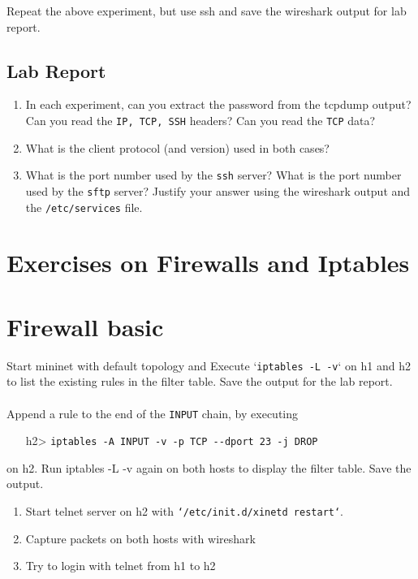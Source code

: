 \documentclass[10pt,a4paper]{article}
\numberwithin{equation}{section}
\numberwithin{figure}{section}
\numberwithin{table}{section}
\begin{document}
	Repeat the above experiment, but use ssh and save the wireshark output for lab report.
	
	\subsection*{Lab Report}
	\begin{enumerate}
		\setlength{\itemindent}{0pt}
		\item In each experiment, can you extract the password from the tcpdump output? Can you read the \texttt{IP, TCP, SSH} headers? Can you read the \texttt{TCP} data?
		\item What is the client protocol (and version) used in both cases?
		\item What is the port number used by the \texttt{ssh} server? What is the port number used by the \texttt{sftp} server? Justify your answer using the wireshark output and the \texttt{/etc/services} file.
	\end{enumerate}
	
	
	\section*{Exercises on Firewalls and Iptables}
	\section{Firewall basic}
	Start mininet with default topology and Execute `\texttt{iptables -L -v}` on h1 and h2 to list the existing rules in the filter table. Save the output for the lab report.\\
	\\
	Append a rule to the end of the \texttt{INPUT} chain, by executing
	
	\begin{itemize}
		\setlength{\itemindent}{10pt}
		\item [h2>] \texttt{iptables -A INPUT -v -p TCP -{}-dport 23 -j DROP} 
	\end{itemize}
	
	\setlength{\parindent}{0pt}
	on h2. Run iptables -L -v again on both hosts to display the filter table. Save the output.\\
	
	
	\begin{enumerate}
		\setlength{\itemindent}{0pt}
		\item Start telnet server on h2 with \texttt{`/etc/init.d/xinetd restart`}.
		\item Capture packets on both hosts with wireshark
		\item Try to login with telnet from h1 to h2
	\end{enumerate}
	
\end{document}
